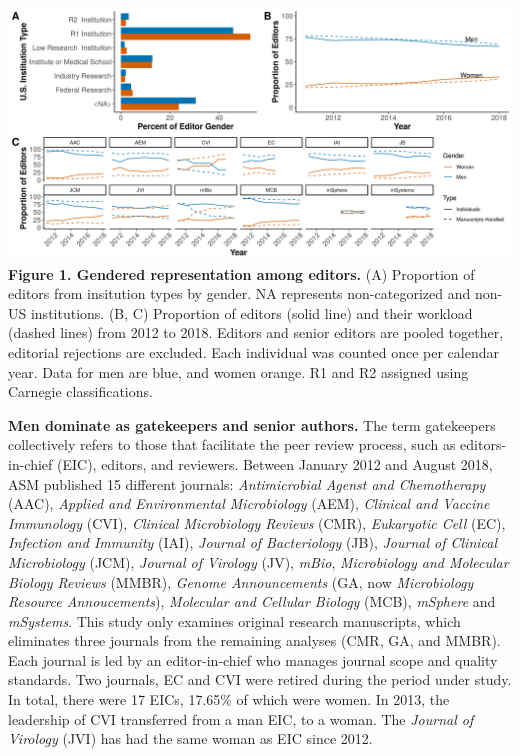 \documentclass[11pt,]{article}
\begin{document}
\includegraphics{Figure_1.png} \textbf{Figure 1. Gendered representation
among editors.} (A) Proportion of editors from insitution types by
gender. NA represents non-categorized and non-US institutions. (B, C)
Proportion of editors (solid line) and their workload (dashed lines)
from 2012 to 2018. Editors and senior editors are pooled together,
editorial rejections are excluded. Each individual was counted once per
calendar year. Data for men are blue, and women orange. R1 and R2
assigned using Carnegie classifications.

\textbf{Men dominate as gatekeepers and senior authors.} The term
gatekeepers collectively refers to those that facilitate the peer review
process, such as editors-in-chief (EIC), editors, and reviewers. Between
January 2012 and August 2018, ASM published 15 different journals:
\emph{Antimicrobial Agenst and Chemotherapy} (AAC), \emph{Applied and
Environmental Microbiology} (AEM), \emph{Clinical and Vaccine
Immunology} (CVI), \emph{Clinical Microbiology Reviews} (CMR),
\emph{Eukaryotic Cell} (EC), \emph{Infection and Immunity} (IAI),
\emph{Journal of Bacteriology} (JB), \emph{Journal of Clinical
Microbiology} (JCM), \emph{Journal of Virology} (JV), \emph{mBio},
\emph{Microbiology and Molecular Biology Reviews} (MMBR), \emph{Genome
Announcements} (GA, now \emph{Microbiology Resource Annoucements}),
\emph{Molecular and Cellular Biology} (MCB), \emph{mSphere} and
\emph{mSystems}. This study only examines original research manuscripts,
which eliminates three journals from the remaining analyses (CMR, GA,
and MMBR). Each journal is led by an editor-in-chief who manages journal
scope and quality standards. Two journals, EC and CVI were retired
during the period under study. In total, there were 17 EICs, 17.65\% of
which were women. In 2013, the leadership of CVI transferred from a man
EIC, to a woman. The \emph{Journal of Virology} (JVI) has had the same
woman as EIC since 2012.
\end{document}
